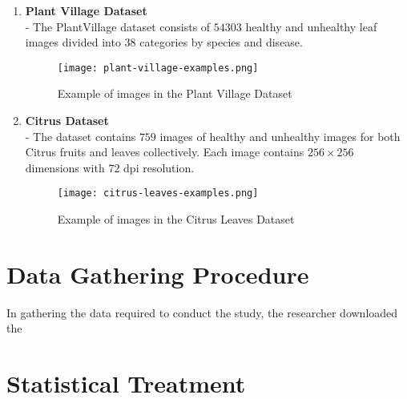 \begin{enumerate}
    \item \textbf{Plant Village Dataset}  \\ 
        - The PlantVillage dataset consists of $54303$ healthy and unhealthy leaf 
         images divided into $38$ categories by species and disease. 
    
         \begin{figure}[h!]
            \centering 
            \texttt{[image: plant-village-examples.png]}
            \caption{Example of images in the Plant Village Dataset}
         \end{figure}


    \item \textbf{Citrus Dataset} \\ 
        - The dataset contains $759$ images of healthy and unhealthy images for both Citrus fruits and
         leaves collectively. Each image contains $256 \times 256$ dimensions with $72$ dpi resolution.  \\ 

         \begin{figure}[h!]
            \centering 
            \texttt{[image: citrus-leaves-examples.png]}
            \caption{Example of images in the Citrus Leaves Dataset}
         \end{figure}


\end{enumerate}

\section{Data Gathering Procedure}
In gathering the data required to conduct the study, the 
researcher downloaded the 


\section{Statistical Treatment}



